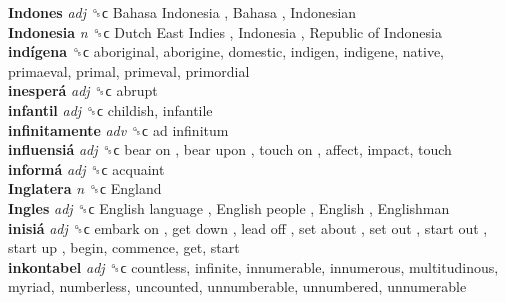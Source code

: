 \textbf{Indones} \emph{adj}  ␝ϲ   Bahasa Indonesia ,  Bahasa ,  Indonesian   \\
\textbf{Indonesia} \emph{n}  ␝ϲ   Dutch East Indies ,  Indonesia ,  Republic of Indonesia   \\
\textbf{indígena} ␝ϲ  aboriginal, aborigine, domestic, indigen, indigene, native, primaeval, primal, primeval, primordial  \\
\textbf{inesperá} \emph{adj}  ␝ϲ  abrupt  \\
\textbf{infantil} \emph{adj}  ␝ϲ  childish, infantile  \\
\textbf{infinitamente} \emph{adv}  ␝ϲ   ad infinitum   \\
\textbf{influensiá} \emph{adj}  ␝ϲ   bear on ,  bear upon ,  touch on , affect, impact, touch  \\
\textbf{informá} \emph{adj}  ␝ϲ  acquaint  \\
\textbf{Inglatera} \emph{n}  ␝ϲ   England   \\
\textbf{Ingles} \emph{adj}  ␝ϲ   English language ,  English people ,  English ,  Englishman   \\
\textbf{inisiá} \emph{adj}  ␝ϲ   embark on ,  get down ,  lead off ,  set about ,  set out ,  start out ,  start up , begin, commence, get, start  \\
\textbf{inkontabel} \emph{adj}  ␝ϲ  countless, infinite, innumerable, innumerous, multitudinous, myriad, numberless, uncounted, unnumberable, unnumbered, unnumerable  \\
